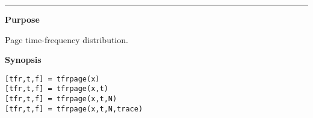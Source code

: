 

\hspace*{-1.6cm}{\Large \bf tfrpage}

\vspace*{-.4cm}
\hspace*{-1.6cm}\rule[0in]{16.5cm}{.02cm}
\vspace*{.2cm}

{\bf \large {}\selectfont Purpose}\\
\hspace*{1.5cm}
\begin{minipage}[t]{13.5cm}
Page time-frequency distribution.
\end{minipage}
\vspace*{.5cm}

{\bf \large {}\selectfont Synopsis}\\
\hspace*{1.5cm}
\begin{minipage}[t]{13.5cm}
\begin{verbatim}
[tfr,t,f] = tfrpage(x)
[tfr,t,f] = tfrpage(x,t)
[tfr,t,f] = tfrpage(x,t,N)
[tfr,t,f] = tfrpage(x,t,N,trace)
\end{verbatim}
\end{minipage}
\vspace*{.5cm}

